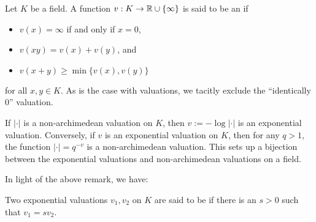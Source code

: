 \begin{definition}
    Let $K$ be a field. A function $v: K\to\mathbb{R}\cup\{\infty\}$ is said to be an  if 
    \begin{itemize}
        \item $v(x) = \infty$ if and only if $x = 0$,
        \item $v(xy) = v(x) + v(y)$, and 
        \item $v(x + y)\ge\min\{v(x), v(y)\}$
    \end{itemize}
    for all $x,y\in K$. As is the case with valuations, we tacitly exclude the ``identically $0$'' valuation.
\end{definition}

\begin{remark}
    If $|\cdot|$ is a non-archimedean valuation on $K$, then $v := -\log |\cdot|$ is an exponential valuation. Conversely, if $v$ is an exponential valuation on $K$, then for any $q > 1$, the function $|\cdot| = q^{-v}$ is a non-archimedean valuation. This sets up a bijection between the exponential valuations and non-archimedean valuations on a field.
\end{remark}

In light of the above remark, we have:

\begin{definition}
    Two exponential valuations $v_1, v_2$ on $K$ are said to be  if there is an $s > 0$ such that $v_1 = sv_2$.
\end{definition}

